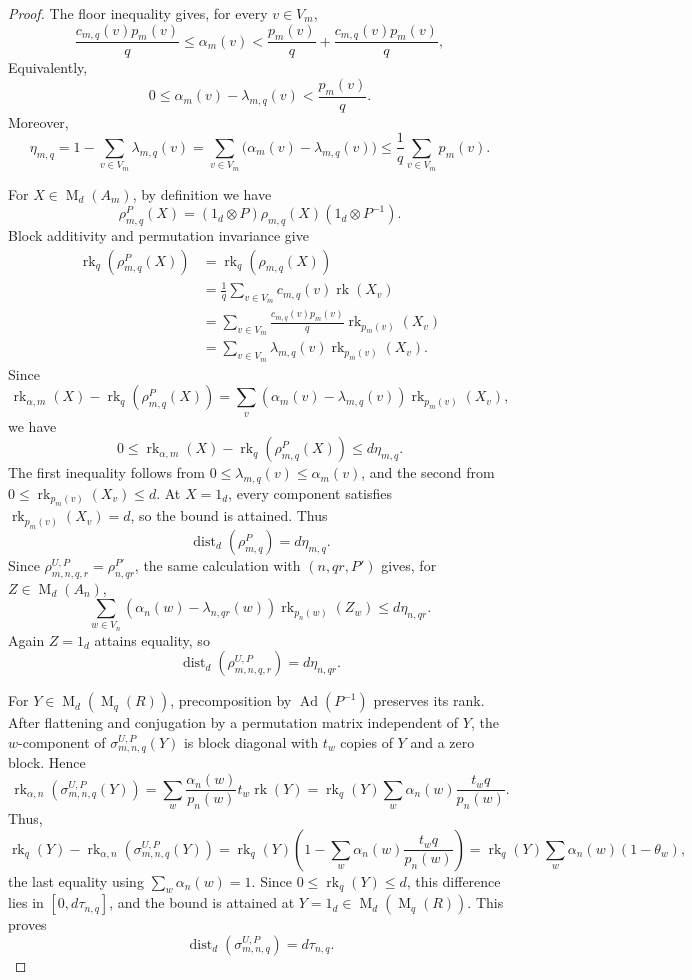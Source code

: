 \documentclass[10pt,a4paper]{amsart}
\DeclareMathOperator{\Ad}{Ad}
\DeclareMathOperator{\Mat}{M}
\DeclareMathOperator{\rk}{rk}
\begin{document}
\begin{proof}
The floor inequality gives, for every $v\in V_m$,
  \[
\frac{c_{m,q}(v)p_m(v)}q\leq\alpha_m(v)<\frac{p_m(v)}q + \frac{c_{m,q}(v)p_m(v)}q,
\]
Equivalently,
\[
0\leq\alpha_m(v) -  \lambda_{m,q}(v)<\frac{p_m(v)}q.
\]
Moreover,
\[
  \eta_{m,q}
  = 1- \sum_{v\in V_m}\lambda_{m,q}(v)
 =\sum_{v\in V_m}\bigl(\alpha_m(v)-\lambda_{m,q}(v)\bigr)\leq\frac1q\sum_{v\in V_m}p_m(v).
\]

For $X\in\Mat_d(A_m)$, by definition we have
\[
  \rho_{m,q}^{P}(X)
  =(1_d\otimes P)\rho_{m,q}(X)(1_d\otimes P^{-1}).
\]
Block additivity and permutation invariance give
\[
 \begin{aligned}
 \rk_q(\rho_{m,q}^{P}(X))
   & =  \rk_q (\rho_{m,q}(X))\\
   & =\frac1q\sum_{v\in V_m}c_{m,q}(v)\rk(X_v)\\
 &=\sum_{v\in V_m}\frac{c_{m,q}(v)p_m(v)}q
        \rk_{p_m(v)}(X_v)\\
 &=\sum_{v\in V_m}\lambda_{m,q}(v)\rk_{p_m(v)}(X_v).
 \end{aligned}
\]
Since
\[
\rk_{\alpha,m}(X)-\rk_q(\rho_{m,q}^{P}(X))=\sum_v(\alpha_m(v)-\lambda_{m,q}(v))\rk_{p_m(v)}(X_v),
\]
we have
\[
0\leq \rk_{\alpha,m}(X)-\rk_q(\rho_{m,q}^{P}(X))\leq d\eta_{m,q}.
\]
The first inequality follows from
$0\leq\lambda_{m,q}(v)\leq\alpha_m(v)$, and the second from
$0\leq\rk_{p_m(v)}(X_v)\leq d$.
At $X=1_d$, every component satisfies $\rk_{p_m(v)}(X_v)=d$,
so the bound is attained.  Thus
\[
 \operatorname{dist}_d(\rho_{m,q}^{P})=d\eta_{m,q}.
\]
Since $\rho_{m,n,q,r}^{U,P}=\rho_{n,qr}^{P'}$, the same calculation
with $(n,qr,P')$ gives, for $Z\in\Mat_d(A_n)$,
\[
  \sum_{w\in V_n}(\alpha_n(w)-\lambda_{n,qr}(w))
  \rk_{p_n(w)}(Z_w)\leq d\eta_{n,qr}.
\]
Again $Z=1_d$ attains equality, so
\[
\operatorname{dist}_d(\rho_{m,n,q,r}^{U,P})=d\eta_{n,qr}.
\]

For $Y\in\Mat_d(\Mat_q(R))$, precomposition by $\Ad(P^{-1})$
preserves its rank.
After flattening and conjugation by a permutation matrix independent of $Y$,
the $w$-component of $\sigma_{m,n,q}^{U,P}(Y)$ is block diagonal with
$t_w$ copies of $Y$ and a zero block.  Hence
\[
 \rk_{\alpha,n}(\sigma_{m,n,q}^{U,P}(Y))
 =\sum_w\frac{\alpha_n(w)}{p_n(w)}t_w\rk(Y)
 =\rk_q(Y)\sum_w\alpha_n(w)\frac{t_wq}{p_n(w)}.
\]
Thus,
\[
\rk_q(Y) - \rk_{\alpha,n}(\sigma_{m,n,q}^{U,P}(Y)) =
\rk_q(Y)\left(1-\sum_w\alpha_n(w)\frac{t_wq}{p_n(w)}\right) =
\rk_q(Y)\sum_w\alpha_n(w) (1-\theta_w),
\]
the last equality using $\sum_w\alpha_n(w)=1$.
Since $0\leq\rk_q(Y)\leq d$, this difference lies in $[0,d\tau_{n,q}]$, and the bound is
attained at $Y=1_d\in\Mat_d(\Mat_q(R))$.
This proves
\[
\operatorname{dist}_d(\sigma_{m,n,q}^{U,P})=d\tau_{n,q}.
\]


\end{proof}
\end{document}
